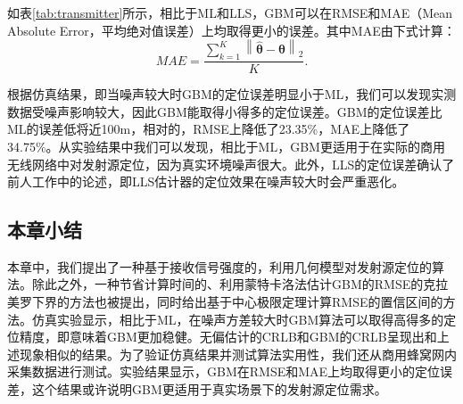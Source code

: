 如表\ref{tab:transmitter}所示，相比于ML和LLS，GBM可以在RMSE和MAE（Mean Absolute Error，平均绝对值误差）上均取得更小的误差。其中MAE由下式计算：
\begin{equation}
MAE = \frac{\sum\limits_{k=1}^K{\left\| \widehat{\bm{\theta}} - \bm{\theta} \right\|}_2}{K}.
\end{equation}

根据仿真结果，即当噪声较大时GBM的定位误差明显小于ML，我们可以发现实测数据受噪声影响较大，因此GBM能取得小得多的定位误差。GBM的定位误差比ML的误差低将近100m，相对的，RMSE上降低了23.35\%，MAE上降低了34.75\%。从实验结果中我们可以发现，相比于ML，GBM更适用于在实际的商用无线网络中对发射源定位，因为真实环境噪声很大。此外，LLS的定位误差确认了前人工作中的论述，即LLS估计器的定位效果在噪声较大时会严重恶化。

\subsection{本章小结}

本章中，我们提出了一种基于接收信号强度的，利用几何模型对发射源定位的算法。除此之外，一种节省计算时间的、利用蒙特卡洛法估计GBM的RMSE的克拉美罗下界的方法也被提出，同时给出基于中心极限定理计算RMSE的置信区间的方法。仿真实验显示，相比于ML，在噪声方差较大时GBM算法可以取得高得多的定位精度，即意味着GBM更加稳健。无偏估计的CRLB和GBM的CRLB呈现出和上述现象相似的结果。为了验证仿真结果并测试算法实用性，我们还从商用蜂窝网内采集数据进行测试。实验结果显示，GBM在RMSE和MAE上均取得更小的定位误差，这个结果或许说明GBM更适用于真实场景下的发射源定位需求。






